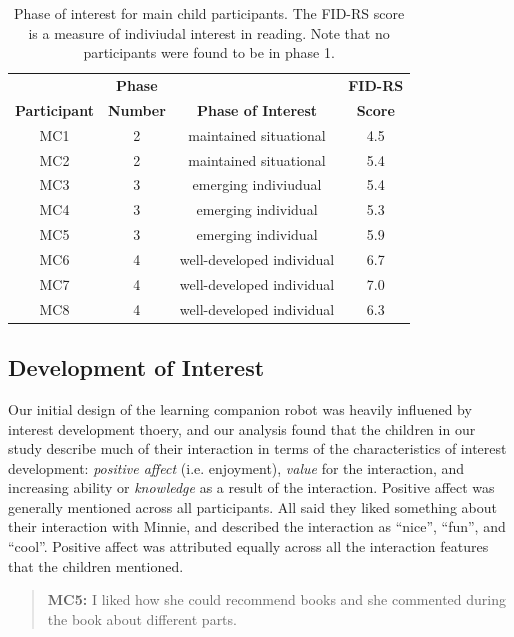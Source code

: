 \documentclass{sigchi}
\begin{document}
\begin{table}[]
	\centering
	\begin{tabular}{cccc}
		& {\small \textbf{Phase}} & & {\small \textbf{FID-RS}} \\
		{\small \textbf{Participant}} & {\small \textbf{Number}}& {\small \textbf{Phase of Interest}}
		& {\small \textbf{Score}} \\
		\midrule		
		MC1  & 2       & maintained situational    & 4.5    \\
		MC2  & 2       & maintained situational    & 5.4    \\
		MC3  & 3       & emerging indiviudual      & 5.4    \\
		MC4  & 3       & emerging individual       & 5.3    \\
		MC5  & 3       & emerging individual       & 5.9    \\
		MC6  & 4       & well-developed individual & 6.7    \\
		MC7  & 4       & well-developed individual & 7.0    \\
		MC8  & 4       & well-developed individual & 6.3   \\
		\midrule     
	\end{tabular}
	\caption{Phase of interest for main child participants. The FID-RS score is a measure of indiviudal interest in reading. Note that no participants were found to be in phase 1.}
	\label{tab:table1}
\end{table}

\subsection{Development of Interest}

Our initial design of the learning companion robot was heavily influened by interest development thoery, and our analysis found that the children in our study describe much of their interaction in terms of the characteristics of interest development: \textit{positive affect} (i.e. enjoyment), \textit{value} for the interaction, and increasing ability or \textit{knowledge} as a result of the interaction. Positive affect was generally mentioned across all participants. All said they liked something about their interaction with Minnie, and described the interaction as ``nice'', ``fun'', and ``cool''. Positive affect was attributed equally across all the interaction features that the children mentioned.
	\begin{quote}
		\textbf{MC5:} I liked how she could recommend books and she commented during the book about different parts.
	\end{quote}
		
\end{document}
